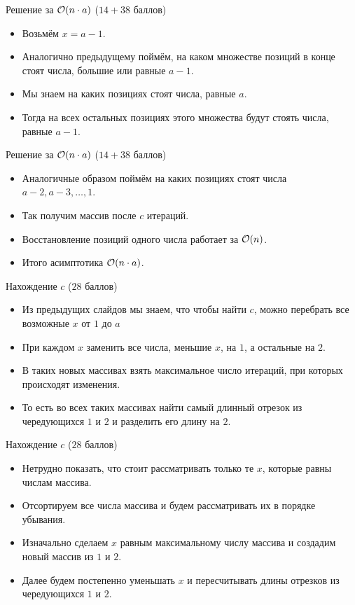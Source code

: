 \begin{frame}{Решение за $\mathcal{O}(n \cdot a)$ ($14 + 38$ баллов)}
  \begin{itemize}
  \item Возьмём $x = a - 1$.
  \item Аналогично предыдущему поймём, на каком множестве позиций в конце стоят числа, большие или равные $a - 1$.
  \item Мы знаем на каких позициях стоят числа, равные $a$.
  \item Тогда на всех остальных позициях этого множества будут стоять числа, равные $a - 1$.
  \end{itemize}
\end{frame}

\begin{frame}{Решение за $\mathcal{O}(n \cdot a)$ ($14 + 38$ баллов)}
  \begin{itemize}
  \item Аналогичные образом поймём на каких позициях стоят числа $a - 2, a - 3, \ldots, 1$.
  \item Так получим массив после $c$ итераций.
  \item Восстановление позиций одного числа работает за $\mathcal{O}(n)$.
  \item Итого асимптотика $\mathcal{O}(n \cdot a)$.
  \end{itemize}
\end{frame}

\begin{frame}{Нахождение $c$ ($28$ баллов)}
  \begin{itemize}
  \item Из предыдущих слайдов мы знаем, что чтобы найти $c$, можно перебрать все возможные $x$ от $1$ до $a$
  \item При каждом $x$ заменить все числа, меньшие $x$, на $1$, а остальные на $2$.
  \item В таких новых массивах взять максимальное число итераций, при которых происходят изменения.
  \item То есть во всех таких массивах найти самый длинный отрезок из чередующихся $1$ и $2$ и разделить его длину на $2$.
  \end{itemize}
\end{frame}

\begin{frame}{Нахождение $c$ ($28$ баллов)}
  \begin{itemize}
  \item Нетрудно показать, что стоит рассматривать только те $x$, которые равны числам массива.
  \item Отсортируем все числа массива и будем рассматривать их в порядке убывания.
  \item Изначально сделаем $x$ равным максимальному числу массива и создадим новый массив из $1$ и $2$.
  \item Далее будем постепенно уменьшать $x$ и пересчитывать длины отрезков из чередующихся $1$ и $2$.
  \end{itemize}
\end{frame}

